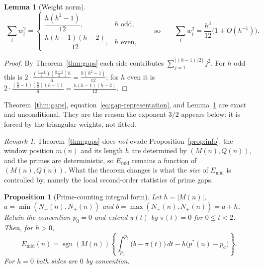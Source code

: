 \documentclass[11pt]{amsart}
\numberwithin{equation}{section}
\theoremstyle{plain}
\newtheorem{proposition}[theorem]{Proposition}
\newtheorem{lemma}[theorem]{Lemma}
\theoremstyle{definition}
\theoremstyle{remark}
\newtheorem{remark}[theorem]{Remark}
\newcommand{\Mert}{M}
\newcommand{\Sq}{Q}
\begin{document}
\begin{lemma}[Weight norm]\label{lem:w2}
\begin{equation}
\label{eq:weight-norm}
\boxed{\;
\sum_i w_i^{2}=
\begin{cases}
\dfrac{h(h^{2}-1)}{12}, & h \text{ odd},\\[3mm]
\dfrac{h(h-1)(h-2)}{12}, & h \text{ even},
\end{cases}
\qquad\text{so}\qquad
\sum_i w_i^{2}=\frac{h^{3}}{12}\bigl(1+O(h^{-1})\bigr). }
\end{equation}
\end{lemma}

\begin{proof}
By Theorem~\ref{thm:gaps} each side contributes
$\sum_{j=1}^{\lfloor (h-1)/2\rfloor}j^{2}$. For $h$ odd this is
$2\cdot\frac{(\frac{h-1}2)(\frac{h+1}2)h}{6}=\frac{h(h^{2}-1)}{12}$; for $h$ even
it is $2\cdot\frac{(\frac h2-1)(\frac h2)(h-1)}{6}=\frac{h(h-1)(h-2)}{12}$.
\end{proof}

Theorem~\ref{thm:gaps}, equation~\eqref{eq:gap-representation}, and Lemma~\ref{lem:w2} are exact and unconditional. They
are the reason the exponent $3/2$ appears below: it is forced by the triangular
weights, not fitted.

\begin{remark}
\label{rem:gap-information}
Theorem~\ref{thm:gaps} does \emph{not} evade Proposition~\ref{prop:info}: the
window position $m(n)$ and its length $h$ are determined by
$(\Mert(n),\Sq(n))$, and the primes are deterministic, so $E_{\mathrm{mid}}$
remains a function of $(\Mert(n),\Sq(n))$. What the theorem changes is what the
\emph{size} of $E_{\mathrm{mid}}$ is controlled by, namely the local second-order
statistics of prime gaps.
\end{remark}

\begin{proposition}[Prime-counting integral form]\label{prop:pi-integral}
Let $h=|\Mert(n)|$, $a=\min(N_-(n),N_+(n))$ and
$b=\max(N_-(n),N_+(n))=a+h$. Retain the convention $p_0=0$ and extend
$\pi(t)$ by $\pi(t)=0$ for $0\le t<2$. Then, for $h>0$,
\begin{equation}
\label{eq:prime-counting-integral}
\boxed{
E_{\mathrm{mid}}(n)=\operatorname{sgn}(\Mert(n))
\left\{\int_{p_a}^{p_b}\bigl(b-\pi(t)\bigr)\,dt
-h\bigl(p^*(n)-p_a\bigr)\right\}. }
\end{equation}
For $h=0$ both sides are $0$ by convention.
\end{proposition}
\end{document}
